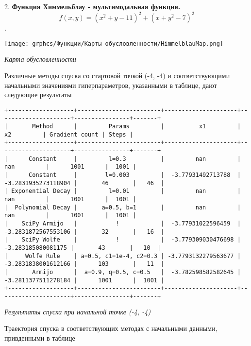 \documentclass{article}
\begin{document}
\newpage

\begin{enumerate}
    2. { \bf Функция Химмельблау - мультимодальная функция. }
    $$ f(x, y) = (x^2 + y - 11)^2 + (x + y^2 - 7)^2 $$.
\end{enumerate}

\begin{center}
    \texttt{[image: grphcs/Функции/Карты обусловленности/HimmelblauMap.png]}

    { \it Карта обусловленности}
\end{center}

Различные методы спуска со стартовой точкой (-4, -4) и соответствующими начальными значениями гиперпараметров, указанными в таблице, дают следующие результаты

\begin{center}
{ \scriptsize
\begin{verbatim}
+-------------------+------------------------+---------------------+---------------------+----------------+-------+
|       Method      |         Params         |          x1         |          x2         | Gradient count | Steps |
+-------------------+------------------------+---------------------+---------------------+----------------+-------+
|      Constant     |         l=0.3          |         nan         |         nan         |      1001      |  1001 |
|      Constant     |        l=0.003         |  -3.77931492713788  | -3.2831935273118904 |       46       |   46  |
| Exponential Decay |         l=0.01         |         nan         |         nan         |      1001      |  1001 |
|  Polynomial Decay |       a=0.5, b=1       |         nan         |         nan         |      1001      |  1001 |
|    SciPy Armijo   |           !            |  -3.77931022596459  | -3.2831872567553106 |       32       |   16  |
|    SciPy Wolfe    |           !            |  -3.779309030476698 |  -3.283185080081175 |       43       |   10  |
|     Wolfe Rule    | a=0.5, c1=1e-4, c2=0.3 | -3.7793132279563677 | -3.2831838001612166 |      103       |   11  |
|       Armijo      |  a=0.9, q=0.5, c=0.5   |  -3.782598582582645 | -3.2811377511278184 |      1001      |  1001 |
+-------------------+------------------------+---------------------+---------------------+----------------+-------+
\end{verbatim}
}
{ \it Результаты спуска при начальной точке (-4, -4)}
\end{center}

Траектория спуска в соответствующих методах с начальными данными, привденными в таблице
\end{document}
